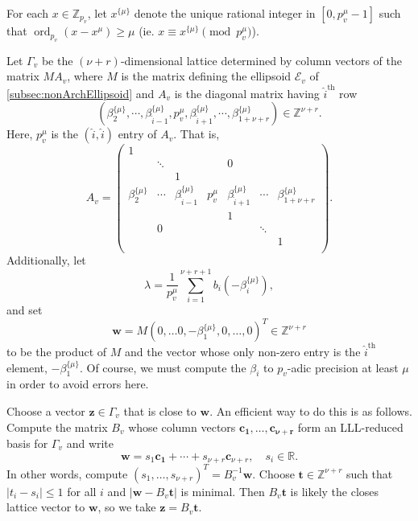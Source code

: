 \documentclass[11pt]{report}
\theoremstyle{definition}
\DeclareMathOperator{\ord}{ord}
\begin{document}
For each $x \in \mathbb{Z}_{p_v}$, let $x^{\{\mu\}}$ denote the unique rational integer in $[0,p_v^{\mu} - 1]$ such that $\ord_{p_v}(x - x^{\mu}) \geq \mu$ (ie. $x \equiv x^{\{\mu\}} \pmod{p_v^{\mu}}$).

Let $\Gamma_{v}$ be the $(\nu+r)$-dimensional lattice determined by column vectors of the matrix $MA_{v}$, where $M$ is the matrix defining the ellipsoid $\mathcal{E}_v$ of \autoref{subsec:nonArchEllipsoid} and $A_{v}$ is the diagonal matrix having $\hat{i}^{\text{th}}$ row
\[\left(\beta_2^{\{\mu\}}, \cdots, \beta_{\hat{i} - 1}^{\{\mu\}}, p_v^{\mu}, \beta_{\hat{i} + 1}^{\{\mu\}}, \cdots, \beta_{1+ \nu+ r}^{\{\mu\}}\right) \in \mathbb{Z}^{\nu+r}.\]
Here, $p_v^{\mu}$ is the $(\hat{i},\hat{i})$ entry of $A_{v}$. That is,
\[A_{v} =
  \begin{pmatrix}
    1 &		&		&		&		&		&	\\
    & \ddots	& 		&		& 0		& 		&	\\
    &		& 1		&		&		&		&	\\
    \beta_2^{\{\mu\}}& \cdots & \beta_{\hat{i} - 1}^{\{\mu\}} & p_v^{\mu} & \beta_{\hat{i} + 1}^{\{\mu\}}& \cdots &\beta_{1+ \nu+ r}^{\{\mu\}}\\
    & 		& 		& 		& 1		&		&	\\
    & 0		& 		& 		&		& \ddots	&	\\
    & 		& 		& 		&		& 		& 1	\\
  \end{pmatrix}.\]
Additionally, let
\[\lambda = \frac{1}{p_v^{\mu}}\sum_{i = 1}^{\nu + r + 1}b_i(-\beta_i^{\{\mu\}}),\]
and set
\[\mathbf{w} = M(0, \dots 0, -\beta_1^{\{\mu\}},0, \dots, 0)^T \in \mathbb{Z}^{\nu + r}\]
to be the product of $M$ and the vector whose only non-zero entry is the $\hat{i}^{\text{th}}$ element, $ -\beta_1^{\{\mu\}}$. Of course, we must compute the $\beta_i$ to $p_v$-adic precision at least $\mu$ in order to avoid errors here.

Choose a vector $\mathbf{z} \in \Gamma_v$ that is close to $\mathbf{w}$. An efficient way to do this is as follows. Compute the matrix $B_v$ whose column vectors $\mathbf{c_1},\dots, \mathbf{c_{\nu + r}}$ form an LLL-reduced basis for $\Gamma_v$ and write
\[\mathbf{w} = s_1\mathbf{c_1} + \cdots + s_{\nu + r}\mathbf{c}_{\nu + r}, \quad s_i \in \mathbb{R}.\]
In other words, compute $(s_1, \dots, s_{\nu + r})^T = B_v^{-1}\mathbf{w}$. Choose $\mathbf{t} \in \mathbb{Z}^{\nu + r}$ such that $|t_i - s_i| \leq 1$ for all $i$ and $|\mathbf{w} - B_v\mathbf{t}|$ is minimal. Then $B_v\mathbf{t}$ is likely the closes lattice vector to $\mathbf{w}$, so we take $\mathbf{z} = B_v\mathbf{t}$.
\end{document}
